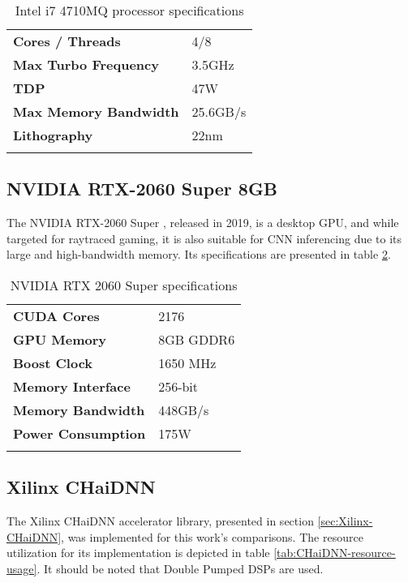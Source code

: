 \begin{table}[H]
	\caption{Intel i7 4710MQ processor specifications}
	\label{tab:Intel-i7-4710MQ-specs}
	\centering
	\begin{tabular}{ll}
		\toprule
		\textbf{Cores / Threads} & 4/8\\
		\textbf{Max Turbo Frequency} & 3.5GHz\\
		\textbf{TDP} & 47W\\
		\textbf{Max Memory Bandwidth} & 25.6GB/s\\
		\textbf{Lithography} & 22nm\\
		\bottomrule\\
	\end{tabular}
\end{table}

\subsection{NVIDIA RTX-2060 Super 8GB}
The NVIDIA RTX-2060 Super \cite{NVIDIA-RTX-2060-Super}, released in 2019, is a desktop GPU, and while targeted for raytraced gaming, it is also suitable for CNN inferencing due to its large and high-bandwidth memory. Its specifications are presented in table \ref{tab:NVIDIA-RTX-2060-Super-specs}.

\begin{table}[H]
	\caption{NVIDIA RTX 2060 Super specifications}
	\label{tab:NVIDIA-RTX-2060-Super-specs}
	\centering
	\begin{tabular}{ll}
		\toprule
		\textbf{CUDA Cores} & 2176\\
		\textbf{GPU Memory} & 8GB GDDR6\\
		\textbf{Boost Clock} & 1650 MHz\\
		\textbf{Memory Interface} & 256-bit\\
		\textbf{Memory Bandwidth} & 448GB/s\\
		\textbf{Power Consumption} & 175W\\
		\bottomrule\\
	\end{tabular}
\end{table}

\subsection{Xilinx CHaiDNN}
The Xilinx CHaiDNN accelerator library, presented in section \ref{sec:Xilinx-CHaiDNN}, was implemented for this work's comparisons. The resource utilization for its implementation is depicted in table \ref{tab:CHaiDNN-resource-usage}. It should be noted that Double Pumped DSPs are used.

